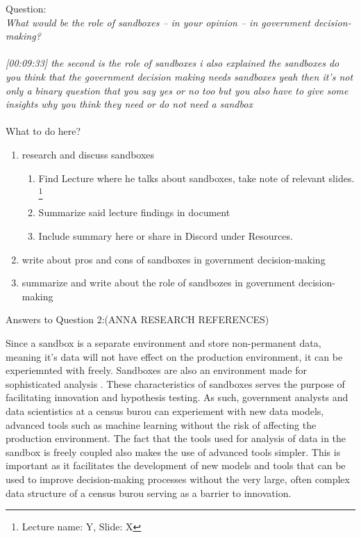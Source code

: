 Question:\\
\emph{
    What would be the role of sandboxes – in your opinion – in government decision-making?
}\\\\
\emph{[00:09:33] the second is the role of sandboxes i also explained the sandboxes do you think that the government decision making needs sandboxes
yeah then it's not only a binary question that you say yes or no too but you also have to give some insights
why you think they need or do not need a sandbox}\\\\
What to do here?
\begin{enumerate}
    \item research and discuss sandboxes
    \begin{enumerate}
    \item Find Lecture where he talks about sandboxes, take note of relevant slides.
    \footnote{Lecture name: Y, Slide: X}
    \item Summarize said lecture findings in document
    \item Include summary here or share in Discord under Resources.
    \end{enumerate}
    \item write about pros and cons of sandboxes in government decision-making
    \item summarize and write about the role of sandbozes in government decision-making
  \end{enumerate}

\newpage Answers to Question 2:(ANNA RESEARCH REFERENCES)

Since a sandbox is a separate environment and store non-permanent data\cite{l2video}, meaning it's data will not have effect on 
the production environment, it can be experiemnted with freely. Sandboxes are also an environment made for sophisticated analysis \cite{l2video}.
These characteristics of sandboxes serves the purpose of facilitating innovation and hypothesis testing.
As such, government analysts and data scientistics at a census burou can experiement with new data models, advanced tools such as machine learning
without the risk of affecting the production environment. The fact that the tools used for analysis of data in the sandbox is freely coupled \cite{l2video} also makes the use of advanced tools simpler.
This is important as it facilitates the development of new models and tools that can be used to improve decision-making processes
without the very large, often complex data structure of a census burou serving as a barrier to innovation.

